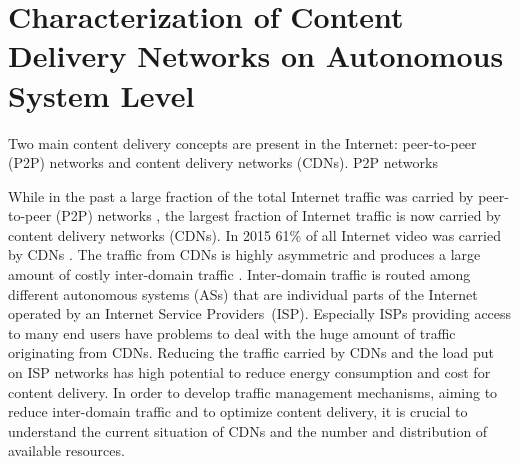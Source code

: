 \chapter{Characterization of Content Delivery Networks on Autonomous System Level}\label{chap:aslevel}

Two main content delivery concepts are present in the Internet: peer-to-peer (P2P) networks and content delivery networks (CDNs).
P2P networks


While in the past a large fraction of the total Internet traffic was carried by peer-to-peer (P2P) networks \cite{Cisc09}, the largest fraction of Internet traffic is now carried by content delivery networks (CDNs).
In 2015 61\% of all Internet video was carried by CDNs \cite{cisco2016}.
The traffic from CDNs is highly asymmetric and produces a large amount of costly inter-domain traffic \cite{labovitz2010internet}.
Inter-domain traffic is routed among different autonomous systems (ASs) that are individual parts of the Internet operated by an Internet Service Providers~(ISP).
Especially ISPs providing access to many end users have problems to deal with the huge amount of traffic originating from CDNs.
Reducing the traffic carried by CDNs and the load put on ISP networks has high potential to reduce energy consumption and cost for content delivery.
In order to develop traffic management mechanisms, aiming to reduce inter-domain traffic and to optimize content delivery, it is crucial to understand the current situation of CDNs and the number and distribution of available resources.

